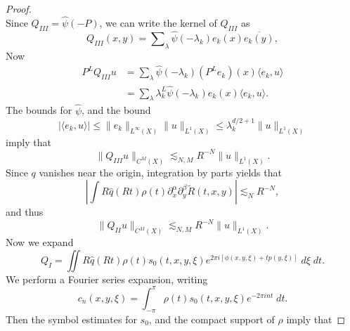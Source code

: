\begin{proof}
\begin{equation}
    \end{equation}
    Since $Q_{III} = \widehat{\psi}(-P)$, we can write the kernel of $Q_{III}$ as
    \begin{equation}
        Q_{III}(x,y) = \sum\nolimits_\lambda \widehat{\psi}(-\lambda_k) e_k(x) \overline{e_k(y)},
    \end{equation}
    Now
    \begin{equation}
    \begin{split}
      P^L Q_{III}u &= \sum\nolimits_\lambda \widehat{\psi}(-\lambda_k) (P^L e_k)(x) \langle e_k, u \rangle\\
      &= \sum\nolimits_\lambda \lambda_k^L \widehat{\psi}(-\lambda_k) e_k(x) \langle e_k, u \rangle.
      \end{split}
      \end{equation}
    The bounds for $\widehat{\psi}$, and the bound
    \begin{equation}
      |\langle e_k, u \rangle| \leq \| e_k \|_{L^\infty(X)} \| u \|_{L^1(X)} \leq \lambda_k^{d/2 + 1} \| u \|_{L^1(X)}
    \end{equation}
    imply that
    \begin{equation} \label{QThreeBound}
        \| Q_{III} u \|_{C^M(X)} \lesssim_{N,M} R^{-N} \| u \|_{L^1(X)}.
    \end{equation}
    Since $q$ vanishes near the origin, integration by parts yields that
    \begin{equation}
        \left| \int R \widehat{q}(Rt) \rho(t) \partial_x^\alpha \partial_y^\beta \tilde{R}(t,x,y) \right| \lesssim_N R^{-N},
    \end{equation}
    and thus
    \begin{equation} \label{QTwoBound}
        \| Q_{II} u \|_{C^M(X)} \lesssim_{N,M} R^{-N} \| u \|_{L^1(X)}.
    \end{equation}
    Now we expand
    \begin{equation}
        Q_I = \iint R \widehat{q}(Rt) \rho(t) s_0(t,x,y,\xi) e^{2 \pi i [ \phi(x,y,\xi) + t p(y,\xi) ]}\; d\xi\; dt.
    \end{equation}
    We perform a Fourier series expansion, writing
    \begin{equation} c_n(x,y,\xi) = \int_{-\pi}^\pi \rho(t) s_0(t,x,y,\xi) e^{-2 \pi i n t}\; dt. \end{equation}
    Then the symbol estimates for $s_0$, and the compact support of $\rho$ imply that

\end{proof}
